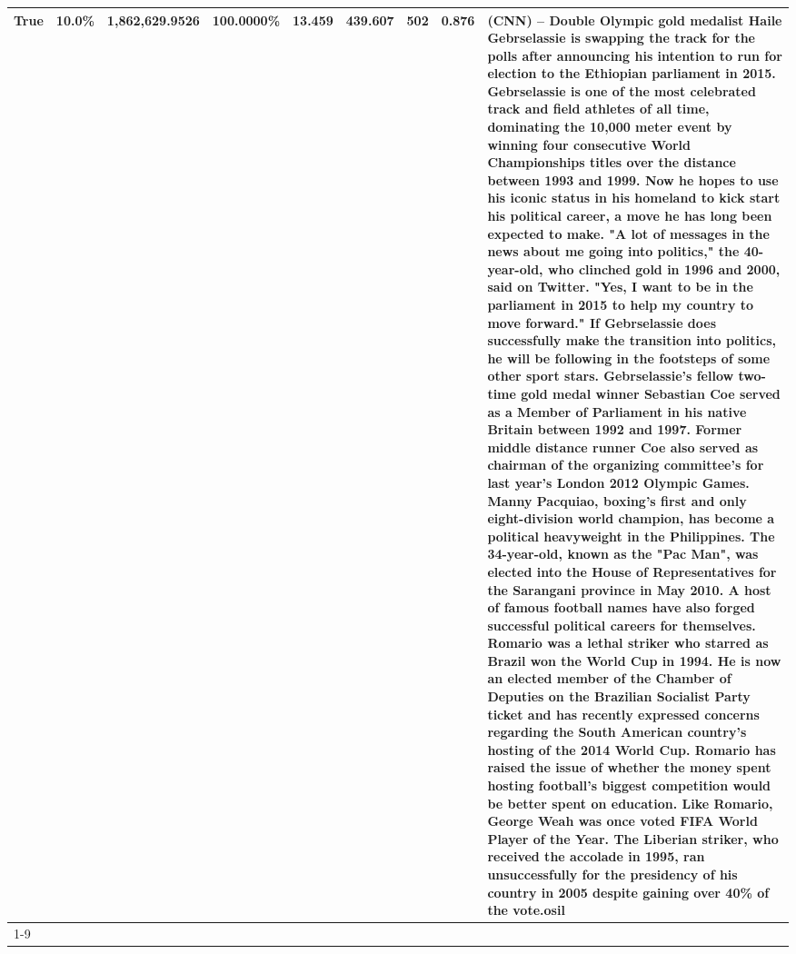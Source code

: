 \begin{table}[H]
{\begin{tabular}{lllrlllll}
True & 10.0\% & 1,862,629.9526 & \bfseries \color{red} 100.0000\% & 13.459 & 439.607 & 502 & 0.876 & (CNN) -- Double Olympic gold medalist Haile Gebrselassie is swapping the track for the polls after announcing his intention to run for election to the Ethiopian parliament in 2015. Gebrselassie is one of the most celebrated track and field athletes of all time, dominating the 10,000 meter event by winning four consecutive World Championships titles over the distance between 1993 and 1999. Now he hopes to use his iconic status in his homeland to kick start his political career, a move he has long been expected to make. "A lot of messages in the news about me going into politics," the 40-year-old, who clinched gold in 1996 and 2000, said on Twitter. "Yes, I want to be in the parliament in 2015 to help my country to move forward." If Gebrselassie does successfully make the transition into politics, he will be following in the footsteps of some other sport stars. Gebrselassie's fellow two-time gold medal winner Sebastian Coe served as a Member of Parliament in his native Britain between 1992 and 1997. Former middle distance runner Coe also served as chairman of the organizing committee's for last year's London 2012 Olympic Games. Manny Pacquiao, boxing's first and only eight-division world champion, has become a political heavyweight in the Philippines. The 34-year-old, known as the "Pac Man", was elected into the House of Representatives for the Sarangani province in May 2010. A host of famous football names have also forged successful political careers for themselves. Romario was a lethal striker who starred as Brazil won the World Cup in 1994. He is now an elected member of the Chamber of Deputies on the Brazilian Socialist Party ticket and has recently expressed concerns regarding the South American country's hosting of the 2014 World Cup. Romario has raised the issue of whether the money spent hosting football's biggest competition would be better spent on education. Like Romario, George Weah was once voted FIFA World Player of the Year. The Liberian striker, who received the accolade in 1995, ran unsuccessfully for the presidency of his country in 2005 despite gaining over 40\% of the vote.osil \\
\cline{1-9}

\end{tabular}}
\end{table}
